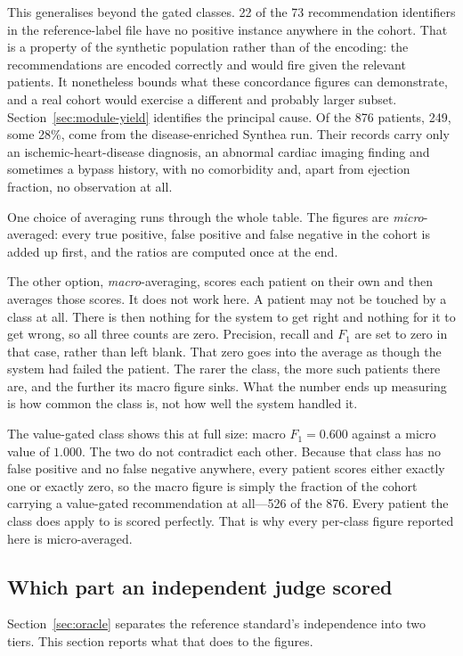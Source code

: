 This generalises beyond the gated classes. 22 of the 73 recommendation
identifiers in the reference-label file have no positive instance anywhere in the cohort. That is
a property of the synthetic population rather than of the encoding: the recommendations are
encoded correctly and would fire given the relevant patients. It nonetheless bounds what these
concordance figures can demonstrate, and a real cohort would exercise a different and probably
larger subset. Section~\ref{sec:module-yield} identifies the principal cause. Of the 876 patients, 249,
some 28\%, come from the disease-enriched Synthea run. Their records carry only an
ischemic-heart-disease diagnosis, an abnormal cardiac imaging finding and sometimes a bypass
history, with no comorbidity and, apart from ejection fraction, no observation at all.

One choice of averaging runs through the whole table. The figures are \emph{micro}-averaged: every true positive, false positive and false
negative in the cohort is added up first, and the ratios are computed once at the end.

The other option, \emph{macro}-averaging, scores each patient on their own and then averages
those scores. It does not work here. A patient may not be touched by a class at all. There is then nothing for the system to get
right and nothing for it to get wrong, so all three counts are zero. Precision, recall and
$F_1$ are set to zero in that case, rather than left blank. That zero
goes into the average as though the system had failed the patient. The rarer the class, the
more such patients there are, and the further its macro figure sinks. What the number ends up
measuring is how common the class is, not how well the system handled it.

The value-gated class shows this at full size: macro $F_1 = 0.600$ against a micro value of
$1.000$. The two do not contradict each other. Because that class has no false positive and no
false negative anywhere, every patient scores either exactly one or exactly zero, so the macro
figure is simply the fraction of the cohort carrying a value-gated recommendation at all---526
of the 876. Every patient the class does apply to is scored perfectly. That is why every
per-class figure reported here is micro-averaged.

\subsection{Which part an independent judge scored}
\label{sec:shared-predicate}
Section~\ref{sec:oracle} separates the reference standard's independence into two tiers. This
section reports what that does to the figures.

